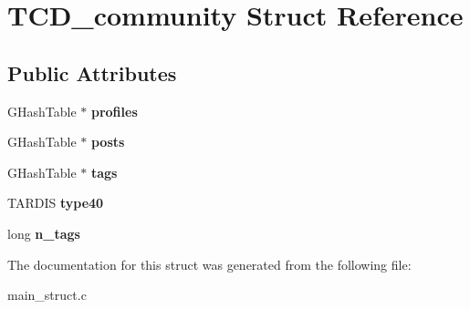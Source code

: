 \hypertarget{structTCD__community}{}\section{T\+C\+D\+\_\+community Struct Reference}
\label{structTCD__community}
\subsection*{Public Attributes}
\begin{DoxyCompactItemize}
\item 
G\+Hash\+Table $\ast$ {\bfseries profiles}\hypertarget{structTCD__community_a4be29aed293dd250c5d39427e5f0b79e}{}\label{structTCD__community_a4be29aed293dd250c5d39427e5f0b79e}

\item 
G\+Hash\+Table $\ast$ {\bfseries posts}\hypertarget{structTCD__community_a655af637328742f0269d8a14abc8707e}{}\label{structTCD__community_a655af637328742f0269d8a14abc8707e}

\item 
G\+Hash\+Table $\ast$ {\bfseries tags}\hypertarget{structTCD__community_a5aee67aa4a533e08d19fc929a35fabba}{}\label{structTCD__community_a5aee67aa4a533e08d19fc929a35fabba}

\item 
T\+A\+R\+D\+IS {\bfseries type40}\hypertarget{structTCD__community_a876bd877fdb43471dd62fdfcce513515}{}\label{structTCD__community_a876bd877fdb43471dd62fdfcce513515}

\item 
long {\bfseries n\+\_\+tags}\hypertarget{structTCD__community_a81cf00e6307625c456420c27c0f5f1df}{}\label{structTCD__community_a81cf00e6307625c456420c27c0f5f1df}

\end{DoxyCompactItemize}


The documentation for this struct was generated from the following file\+:\begin{DoxyCompactItemize}
\item 
main\+\_\+struct.\+c\end{DoxyCompactItemize}
